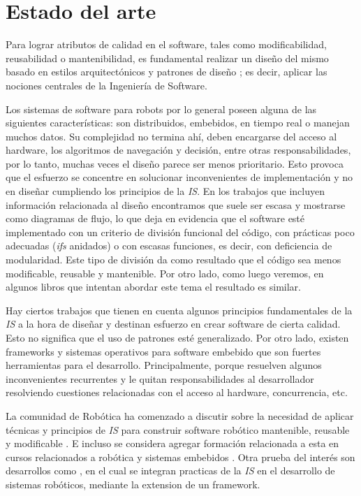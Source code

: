 \chapter{Estado del arte}


Para lograr atributos de calidad en el software, tales como modificabilidad, reusabilidad o mantenibilidad, es fundamental realizar un diseño del mismo basado en estilos arquitectónicos y patrones de diseño \cite{gamma,shawgarlan,buschmann}; es decir, aplicar las nociones centrales de la Ingeniería de Software.

Los sistemas de software para robots por lo general poseen alguna de las siguientes características: son distribuidos, embebidos, en tiempo real o manejan muchos datos. Su complejidad no termina ahí, deben encargarse del acceso al hardware, los algoritmos de navegación y decisión, entre otras responsabilidades, por lo tanto, muchas veces el diseño parece ser menos prioritario. Esto provoca que el esfuerzo se concentre en solucionar inconvenientes de implementación y no en diseñar cumpliendo los principios de la \textit{IS}. En los trabajos que incluyen información relacionada al diseño \cite{bad-desing-auto,bad-desing-implantable,code-1,code-2} encontramos que suele ser escasa y mostrarse como diagramas de flujo, lo que deja en evidencia que el software esté implementado con un criterio de división funcional del código, con prácticas poco adecuadas (\textit{ifs} anidados) o con escasas funciones, es decir, con deficiencia de modularidad. Este tipo de división da como resultado que el código sea menos modificable, reusable y mantenible. Por otro lado, como luego veremos, en algunos libros que intentan abordar este tema \cite{douglass} el resultado es similar.

Hay ciertos trabajos \cite{good-desing-agrobot,good-desing-street} que tienen en cuenta algunos principios fundamentales de la \textit{IS} a la hora de diseñar y destinan esfuerzo en crear software de cierta calidad. Esto no significa que el uso de patrones esté generalizado. Por otro lado, existen \glspl{framework} y sistemas operativos para software embebido \cite{framework-1, framework-ros} que son fuertes herramientas para el desarrollo. Principalmente, porque resuelven algunos inconvenientes recurrentes y le quitan responsabilidades al desarrollador resolviendo cuestiones relacionadas con el acceso al hardware, concurrencia, etc.

La comunidad de Robótica ha comenzado a discutir sobre la necesidad de aplicar técnicas y principios de \textit{IS} para construir software robótico mantenible, reusable y modificable \cite{mejoras-1, mejoras-2}. E incluso se considera agregar formación relacionada a esta en cursos relacionados a robótica y sistemas embebidos \cite{Shin15fase}. Otra prueba del interés son desarrollos como \cite{FernandezMadrigal2003}, en el cual se integran practicas de la \textit{IS} en el desarrollo de sistemas robóticos, mediante la extension de un \gls{framework}. 

